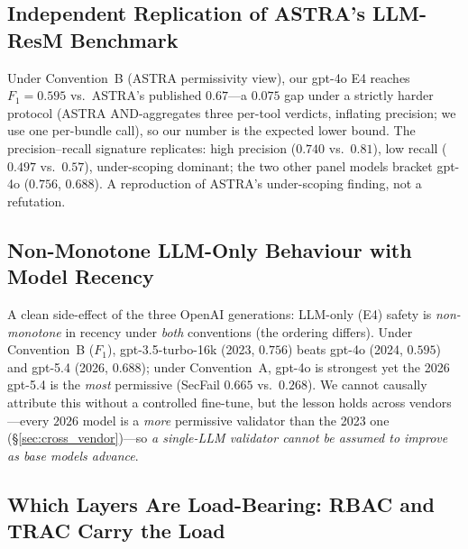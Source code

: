 \documentclass[sigconf,review,anonymous]{acmart}
\begin{document}
\subsection{Independent Replication of ASTRA's LLM-ResM Benchmark}
\label{sec:astra_replication}

Under Convention~B (ASTRA permissivity view), our gpt-4o E4 reaches $F_1=0.595$ vs.\ ASTRA's published $0.67$---a $0.075$ gap under a strictly harder protocol (ASTRA AND-aggregates three per-tool verdicts, inflating precision; we use one per-bundle call), so our number is the expected lower bound. The precision--recall signature replicates: high precision ($0.740$ vs.\ $0.81$), low recall ($0.497$ vs.\ $0.57$), under-scoping dominant; the two other panel models bracket gpt-4o ($0.756$, $0.688$). A reproduction of ASTRA's under-scoping finding, not a refutation.

\subsection{Non-Monotone LLM-Only Behaviour with Model Recency}
\label{sec:newer_not_better}

A clean side-effect of the three OpenAI generations: LLM-only (E4) safety is \emph{non-monotone} in recency under \emph{both} conventions (the ordering differs). Under Convention~B ($F_1$), gpt-3.5-turbo-16k (2023, $0.756$) beats gpt-4o (2024, $0.595$) and gpt-5.4 (2026, $0.688$); under Convention~A, gpt-4o is strongest yet the 2026 gpt-5.4 is the \emph{most} permissive (SecFail $0.665$ vs.\ $0.268$). We cannot causally attribute this without a controlled fine-tune, but the lesson holds across vendors---every $2026$ model is a \emph{more} permissive validator than the 2023 one (\S\ref{sec:cross_vendor})---so \emph{a single-LLM validator cannot be assumed to improve as base models advance}.

\subsection{Which Layers Are Load-Bearing: RBAC and TRAC Carry the Load}
\label{sec:reversal}
\end{document}
